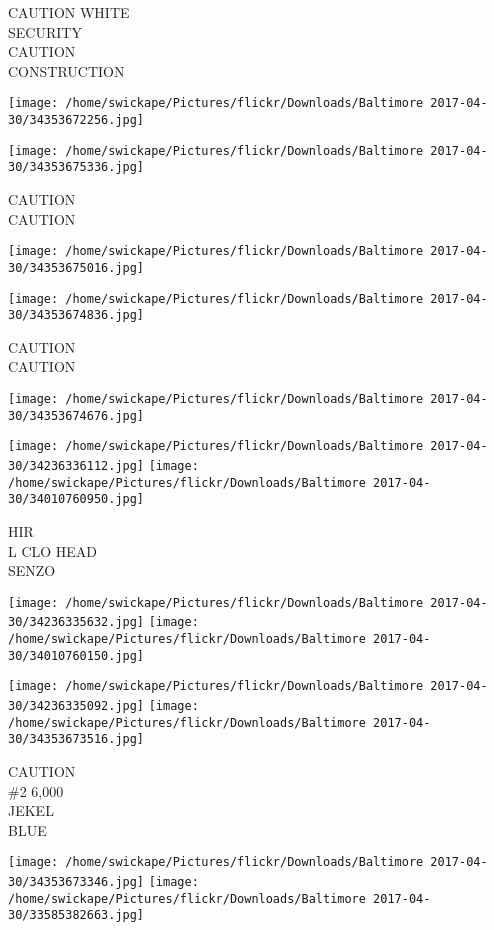 \documentclass[10pt,letterpaper]{article}
\begin{document}
CAUTION WHITE\\
SECURITY\\
CAUTION\\
CONSTRUCTION
\pagebreak

\texttt{[image: /home/swickape/Pictures/flickr/Downloads/Baltimore 2017-04-30/34353672256.jpg]}

\vspace{0.25in}
\texttt{[image: /home/swickape/Pictures/flickr/Downloads/Baltimore 2017-04-30/34353675336.jpg]}

CAUTION\\
CAUTION
\pagebreak

\texttt{[image: /home/swickape/Pictures/flickr/Downloads/Baltimore 2017-04-30/34353675016.jpg]}

\vspace{0.25in}
\texttt{[image: /home/swickape/Pictures/flickr/Downloads/Baltimore 2017-04-30/34353674836.jpg]}

CAUTION\\
CAUTION
\pagebreak

\texttt{[image: /home/swickape/Pictures/flickr/Downloads/Baltimore 2017-04-30/34353674676.jpg]}

\vspace{0.25in}
\texttt{[image: /home/swickape/Pictures/flickr/Downloads/Baltimore 2017-04-30/34236336112.jpg]}
\texttt{[image: /home/swickape/Pictures/flickr/Downloads/Baltimore 2017-04-30/34010760950.jpg]}

HIR\\
L CLO HEAD\\
SENZO
\pagebreak

\texttt{[image: /home/swickape/Pictures/flickr/Downloads/Baltimore 2017-04-30/34236335632.jpg]}
\texttt{[image: /home/swickape/Pictures/flickr/Downloads/Baltimore 2017-04-30/34010760150.jpg]}

\texttt{[image: /home/swickape/Pictures/flickr/Downloads/Baltimore 2017-04-30/34236335092.jpg]}
\texttt{[image: /home/swickape/Pictures/flickr/Downloads/Baltimore 2017-04-30/34353673516.jpg]}

CAUTION\\
\#2 6,000\\
JEKEL\\
BLUE
\pagebreak

\texttt{[image: /home/swickape/Pictures/flickr/Downloads/Baltimore 2017-04-30/34353673346.jpg]}
\texttt{[image: /home/swickape/Pictures/flickr/Downloads/Baltimore 2017-04-30/33585382663.jpg]}
\end{document}
